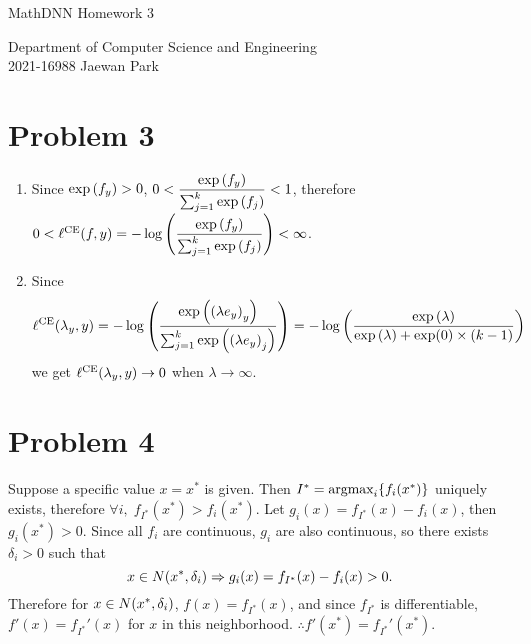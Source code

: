 \documentclass[10pt]{article}
\begin{document}
\begin{center}
    {\LARGE MathDNN Homework 3} \\
\end{center}
\begin{flushright}
    Department of Computer Science and Engineering \\
    2021-16988 Jaewan Park
\end{flushright}

\section*{Problem 3}
\begin{enumerate}[leftmargin=*, label=(\alph*)]
    \item Since $\exp\qty(f_y) > 0$, $0 < \dfrac{\exp\qty(f_y)}{\sum_{j=1}^{k}\exp\qty(f_j)} < 1$, therefore $0 < \ell^{\mathrm{CE}}(f, y) = -\log\qty(\dfrac{\exp\qty(f_y)}{\sum_{j=1}^{k}\exp\qty(f_j)}) < \infty$.
    \item Since 
    $$\ell^{\mathrm{CE}}\qty(\lambda_y, y) = -\log\qty(\frac{\exp\qty(\qty(\lambda e_y)_y)}{\sum_{j=1}^{k}\exp\qty(\qty(\lambda e_y)_j)}) = -\log\qty(\frac{\exp\qty(\lambda)}{\exp\qty(\lambda) + \exp(0) \times (k - 1)})$$
    we get $\ell^{\mathrm{CE}}\qty(\lambda_y, y) \to 0$ when $\lambda \to \infty$.
\end{enumerate}

\section*{Problem 4}
Suppose a specific value $x = x^*$ is given. Then $I^* = \text{argmax}_i\qty{f_i(x^*)}$ uniquely exists, therefore $\forall i, \; f_{I^*}(x^*) > f_i(x^*)$. 
Let $g_i(x) = f_{I^*}(x) - f_i(x)$, then $g_i(x^*) > 0$. Since all $f_i$ are continuous, $g_i$ are also continuous, so there exists $\delta_i > 0$ such that
$$x \in N\qty(x^*, \delta_i) \Rightarrow g_i(x) = f_{I^*}(x) - f_i(x) > 0.$$
Therefore for $x \in N\qty(x^*, \delta_i)$, $f(x) = f_{I^*}(x)$, and since $f_{I^*}$ is differentiable, $f'(x) = f_{I^*}'(x)$ for $x$ in this neighborhood.
$\therefore f'(x^*) = f_{I^*}'(x^*).$
\end{document}
